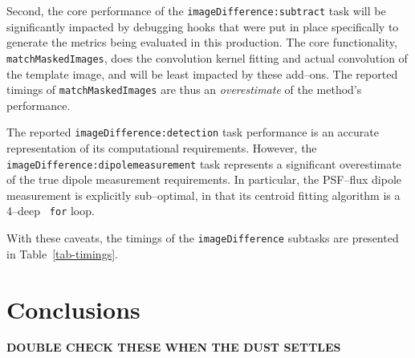 \documentclass[prd, nofootinbib, floatfix, 11pt,tightenlines,times]{article}
\begin{document}
Second, the core performance of the {\tt imageDifference:subtract}
task will be significantly impacted by debugging hooks that were put
in place specifically to generate the metrics being evaluated in this
production.  The core functionality, {\tt matchMaskedImages}, does the
convolution kernel fitting and actual convolution of the template
image, and will be least impacted by these add--ons.  The reported
timings of {\tt matchMaskedImages} are thus an {\it overestimate} of
the method's performance.

The reported {\tt imageDifference:detection} task performance is an
accurate representation of its computational requirements.  However,
the {\tt imageDifference:dipolemeasurement} task represents a
significant overestimate of the true dipole measurement requirements.
In particular, the PSF--flux dipole measurement is explicitly
sub--optimal, in that its centroid fitting algorithm is a 4--deep {\tt
  for} loop.

With these caveats, the timings of the {\tt imageDifference} subtasks
are presented in Table~\ref{tab-timings}.

\section{Conclusions}

{\bf DOUBLE CHECK THESE WHEN THE DUST SETTLES}
\end{document}
